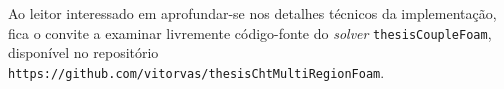 Ao leitor interessado em aprofundar-se nos detalhes técnicos da implementação, fica o
convite a examinar livremente código-fonte do \textit{solver} \texttt{thesisCoupleFoam}, disponível
no repositório \texttt{https://github.com/vitorvas/thesisChtMultiRegionFoam}.








































